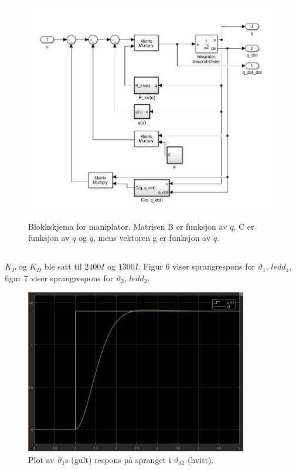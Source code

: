 \documentclass[norsk]{article}
\begin{document}
\begin{figure}[H]
\includegraphics[height=10cm]{illustrations/oppg3b_illu2}
\caption{Blokkskjema for maniplator. Matrisen B er funksjon av \(q\), C er funksjon av \(q\) og \(\dot{q}\), mens vektoren g er funksjon av \(q\).}
\end{figure}

\subsection{ }
\(K_P\) og \(K_D\) ble satt til \(2400I\) og \(1300I\). Figur 6 viser sprangrespons for \(\vartheta_1\), \(ledd_1\), figur 7 viser sprangrespons for \(\vartheta_2\), \(ledd_2\).

\begin{figure}[H]
\includegraphics[height=7.2cm]{illustrations/oppg3c_illu1}
\caption{Plot av \(\vartheta_1\)s (gult) respons på spranget i \(\vartheta_{d1}\) (hvitt).}
\end{figure}
\end{document}
